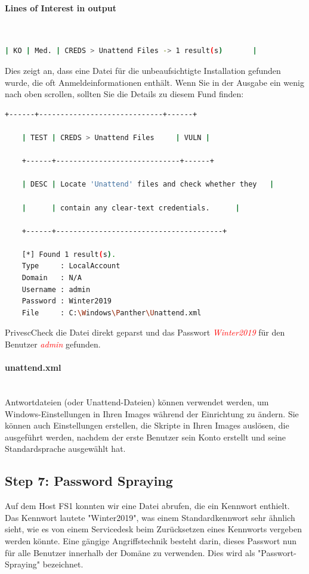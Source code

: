\paragraph{Lines of Interest in output}\mbox{} \\

\begin{lstlisting}[language=bash]
    | KO | Med. | CREDS > Unattend Files -> 1 result(s)       |
\end{lstlisting}

Dies zeigt an, dass eine Datei für die unbeaufsichtigte Installation gefunden wurde, die oft Anmeldeinformationen enthält. Wenn Sie in der Ausgabe ein wenig nach oben scrollen, sollten Sie die Details zu diesem Fund finden:

\begin{lstlisting}[language=bash]
    +------+-----------------------------+------+

    | TEST | CREDS > Unattend Files     | VULN |

    +------+-----------------------------+------+

    | DESC | Locate 'Unattend' files and check whether they   |

    |      | contain any clear-text credentials.      |

    +------+---------------------------------------+

    [*] Found 1 result(s).
    Type     : LocalAccount
    Domain   : N/A
    Username : admin
    Password : Winter2019
    File     : C:\Windows\Panther\Unattend.xml
\end{lstlisting}

PrivescCheck die Datei direkt geparst und das Passwort \textcolor{red}{\textit{Winter2019}} für den Benutzer \textcolor{red}{\textit{admin}} gefunden.

\paragraph{unattend.xml}\mbox{} \\
Antwortdateien (oder Unattend-Dateien) können verwendet werden, um Windows-Einstellungen in Ihren Images während der Einrichtung zu ändern. Sie können auch Einstellungen erstellen, die Skripte in Ihren Images auslösen, die ausgeführt werden, nachdem der erste Benutzer sein Konto erstellt und seine Standardsprache ausgewählt hat.



\subsection{Step 7: Password Spraying}
Auf dem Host FS1 konnten wir eine Datei abrufen, die ein Kennwort enthielt. Das Kennwort lautete "Winter2019", was einem Standardkennwort sehr ähnlich sieht, wie es von einem Servicedesk beim Zurücksetzen eines Kennworts vergeben werden könnte.
Eine gängige Angriffstechnik besteht darin, dieses Passwort nun für alle Benutzer innerhalb der Domäne zu verwenden. Dies wird als "Passwort-Spraying" bezeichnet.

